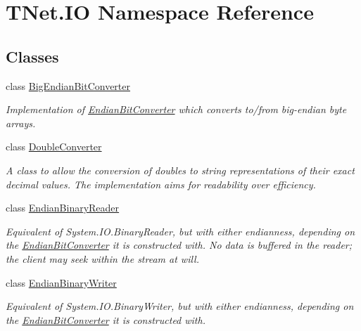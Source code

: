 \hypertarget{namespace_t_net_1_1_i_o}{}\section{T\+Net.\+IO Namespace Reference}
\label{namespace_t_net_1_1_i_o}
\subsection*{Classes}
\begin{DoxyCompactItemize}
\item 
class \mbox{\hyperlink{class_t_net_1_1_i_o_1_1_big_endian_bit_converter}{Big\+Endian\+Bit\+Converter}}
\begin{DoxyCompactList}\small\item\em Implementation of \mbox{\hyperlink{class_t_net_1_1_i_o_1_1_endian_bit_converter}{Endian\+Bit\+Converter}} which converts to/from big-\/endian byte arrays. \end{DoxyCompactList}\item 
class \mbox{\hyperlink{class_t_net_1_1_i_o_1_1_double_converter}{Double\+Converter}}
\begin{DoxyCompactList}\small\item\em A class to allow the conversion of doubles to string representations of their exact decimal values. The implementation aims for readability over efficiency. \end{DoxyCompactList}\item 
class \mbox{\hyperlink{class_t_net_1_1_i_o_1_1_endian_binary_reader}{Endian\+Binary\+Reader}}
\begin{DoxyCompactList}\small\item\em Equivalent of System.\+I\+O.\+Binary\+Reader, but with either endianness, depending on the \mbox{\hyperlink{class_t_net_1_1_i_o_1_1_endian_bit_converter}{Endian\+Bit\+Converter}} it is constructed with. No data is buffered in the reader; the client may seek within the stream at will. \end{DoxyCompactList}\item 
class \mbox{\hyperlink{class_t_net_1_1_i_o_1_1_endian_binary_writer}{Endian\+Binary\+Writer}}
\begin{DoxyCompactList}\small\item\em Equivalent of System.\+I\+O.\+Binary\+Writer, but with either endianness, depending on the \mbox{\hyperlink{class_t_net_1_1_i_o_1_1_endian_bit_converter}{Endian\+Bit\+Converter}} it is constructed with. \end{DoxyCompactList}\item 

\end{DoxyCompactItemize}
